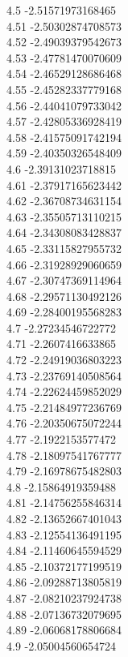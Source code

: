 {4.5	-2.51571973168465\\
4.51	-2.50302874708573\\
4.52	-2.49039379542673\\
4.53	-2.47781470070609\\
4.54	-2.46529128686468\\
4.55	-2.45282337779168\\
4.56	-2.44041079733042\\
4.57	-2.42805336928419\\
4.58	-2.41575091742194\\
4.59	-2.40350326548409\\
4.6	-2.39131023718815\\
4.61	-2.37917165623442\\
4.62	-2.36708734631154\\
4.63	-2.35505713110215\\
4.64	-2.34308083428837\\
4.65	-2.33115827955732\\
4.66	-2.31928929060659\\
4.67	-2.30747369114964\\
4.68	-2.29571130492126\\
4.69	-2.28400195568283\\
4.7	-2.27234546722772\\
4.71	-2.2607416633865\\
4.72	-2.24919036803223\\
4.73	-2.23769140508564\\
4.74	-2.22624459852029\\
4.75	-2.21484977236769\\
4.76	-2.20350675072244\\
4.77	-2.1922153577472\\
4.78	-2.18097541767777\\
4.79	-2.16978675482803\\
4.8	-2.15864919359488\\
4.81	-2.14756255846314\\
4.82	-2.13652667401043\\
4.83	-2.12554136491195\\
4.84	-2.11460645594529\\
4.85	-2.10372177199519\\
4.86	-2.09288713805819\\
4.87	-2.08210237924738\\
4.88	-2.07136732079695\\
4.89	-2.06068178806684\\
4.9	-2.05004560654724\\
}
